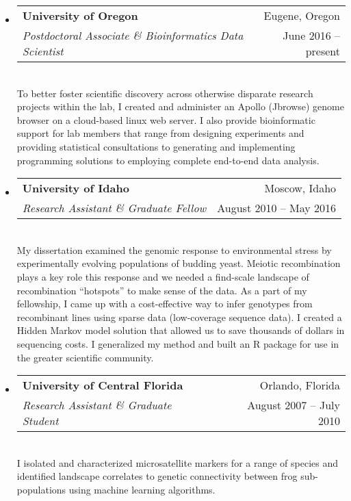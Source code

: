 \documentclass[11pt,letterpaper,sans]{moderncv}        %
\begin{document}
\begin{itemize}

\item{
\centering
  \begin{tabular}{p{15cm}r}
\textbf{University of Oregon} & Eugene, Oregon\\
\textit{Postdoctoral Associate \& Bioinformatics Data Scientist} & June 2016 -- present \\
  \end{tabular}
}
\\
To better foster scientific discovery across otherwise disparate research projects within the lab, I created and administer an Apollo (Jbrowse) genome browser on a cloud-based linux web server. I also provide bioinformatic support for lab members that range from designing experiments and providing statistical consultations to generating and implementing programming solutions to employing complete end-to-end data analysis.
\vspace{4pt}

\item{
\centering
  \begin{tabular}{p{14.2cm}r}
\textbf{University of Idaho} & Moscow, Idaho\\
\textit{Research Assistant \& Graduate Fellow} & August 2010 -- May 2016 \\
  \end{tabular}
}
\\
My dissertation examined the genomic response to environmental stress by experimentally evolving populations of budding yeast. Meiotic recombination plays a key role this response and we needed a find-scale landscape of recombination ``hotspots'' to make sense of the data. As a part of  my fellowship, I came up with a cost-effective way to infer genotypes from recombinant lines using sparse data (low-coverage sequence data). I created a Hidden Markov model solution that allowed us to save thousands of dollars in sequencing costs. I generalized my method and built an R package for use in the greater scientific community. 
\vspace{4pt}

\item{
\centering
  \begin{tabular}{p{14.2cm}r}
\textbf{University of Central Florida} & Orlando, Florida \\
\textit{Research Assistant \& Graduate Student} & August 2007 -- July 2010 \\
  \end{tabular}
}
\\
I isolated and characterized microsatellite markers for a range of species and identified landscape correlates to genetic connectivity between frog sub-populations using machine learning algorithms.

\end{itemize}
\end{document}
